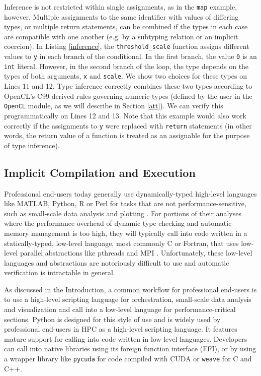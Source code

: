 \documentclass[9pt,preprint]{sigplanconf}
\begin{document}
Inference is not restricted within single assignments, as in the \verb|map| example, however. Multiple assignments to the same identifier with values of differing types, or multiple return statements, can be combined if the types in each case are compatible with one another (e.g. by a subtyping relation or an implicit coercion). In Listing \ref{inference}, the \verb|threshold_scale| function assigns different values to \verb|y| in each branch of the conditional. In the first branch, the value \verb|0| is an \verb|int| literal. However, in the second branch of the loop, the type depends on the types of both arguments, \verb|x| and \verb|scale|. We show two choices for these types on Lines 11 and 12. Type inference correctly combines these two types according to OpenCL's C99-derived rules governing numeric types (defined by the user in the \verb|OpenCL| module, as we will describe in Section \ref{att}). We can verify this programmatically on Lines 12 and 13. Note that this example would also work correctly if the assignments to \verb|y| were replaced with \verb|return| statements (in other words, the return value of a function is treated as an assignable for the purpose of type inference).

\subsection{Implicit Compilation and Execution}\label{compenv}\label{backend}\label{implicit}
Professional end-users today generally use dynamically-typed high-level languages like MATLAB, Python, R or Perl for tasks that are not performance-sensitive, such as small-scale data analysis and plotting \cite{nguyen2010survey}. For portions of their analyses where the performance overhead of dynamic type checking and automatic memory management is too high, they will typically call into code written in a statically-typed, low-level language, most commonly C or Fortran, that uses low-level parallel abstractions like pthreads and MPI \cite{4222616,basili2008understanding}. Unfortunately, these low-level languages and abstractions are notoriously difficult to use and automatic verification is intractable in general.


As discussed in the Introduction, a common workflow for professional end-users is to use a high-level scripting language for orchestration, small-scale data analysis and visualization and call into a low-level language for performance-critical sections. Python is designed for this style of use \cite{sanner1999python} and is widely used by professional end-users in HPC as a high-level scripting language. It features mature support for calling into code written in low-level languages. Developers can call into native libraries using its foreign function interface (FFI),  or by using a wrapper library like \verb|pycuda| for code compiled with CUDA \cite{klockner2011pycuda} or \verb|weave| for C and C++. 
\end{document}
